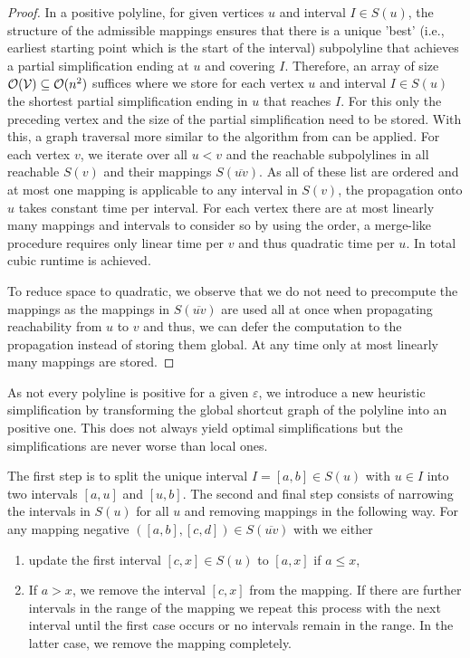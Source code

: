 \begin{proof}
	In a positive polyline, for given vertices \(u\) and interval \(I \in S(u)\), the structure of the admissible mappings ensures that there is a unique 'best' (i.e., earliest starting point which is the start of the interval) subpolyline that achieves a partial simplification ending at \(u\) and covering \(I\). Therefore, an array of size \(\mathcal{O}(\mathcal{V}) \subseteq \mathcal{O}(n^2)\) suffices where we store for each vertex \(u\) and interval \(I \in S(u)\) the shortest partial simplification ending in \(u\) that reaches \(I\). For this only the preceding vertex and the size of the partial simplification need to be stored. With this, a graph traversal more similar to the algorithm from \citeauthor{computational_geometric_methods_for_polygonal_approximations_of_a_curve} can be applied. For each vertex \(v\), we iterate over all \(u < v\) and the reachable subpolylines in all reachable \(S(v)\) and their mappings \(S(\overline{uv})\). As all of these list are ordered and at most one mapping is applicable to any interval in \(S(v)\), the propagation onto \(u\) takes constant time per interval. For each vertex there are at most linearly many mappings and intervals to consider so by using the order, a merge-like procedure requires only linear time per \(v\) and thus quadratic time per \(u\). In total cubic runtime is achieved. 

	To reduce space to quadratic, we observe that we do not need to precompute the mappings as the mappings in \(S(\overline{uv})\) are used all at once when propagating reachability from \(u\) to \(v\) and thus, we can defer the computation to the propagation instead of storing them global. At any time only at most linearly many mappings are stored.
\end{proof}

As not every polyline is positive for a given \(\varepsilon\), we introduce a new heuristic simplification by transforming the global shortcut graph of the polyline into an positive one. This does not always yield optimal simplifications but the simplifications are never worse than local ones.

The first step is to split the unique interval \(I = [a, b] \in S(u)\) with \(u \in I\) into two intervals \([a, u]\) and \([u, b]\). The second and final step consists of narrowing the intervals in \(S(u)\) for all \(u\) and removing mappings in the following way. For any mapping negative \(([a,b], [c,d]) \in S(\overline{uv})\) with we either 
\begin{enumerate}
	\item update the first interval \([c, x] \in S(u)\) to \([a, x]\) if \(a \leq x\),
	\item If \(a > x\), we remove the interval \([c, x]\) from the mapping. If there are further intervals in the range of the mapping we repeat this process with the next interval until the first case occurs or no intervals remain in the range. In the latter case, we remove the mapping completely.
\end{enumerate}

